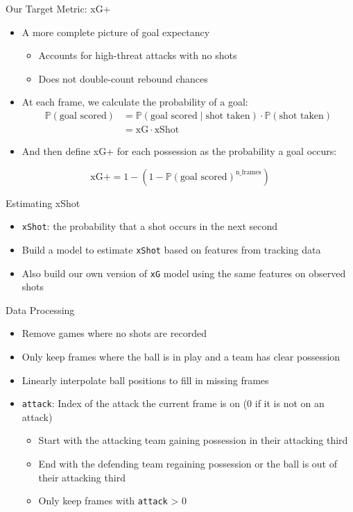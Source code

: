 \documentclass{beamer}
\begin{document}
\begin{frame}{Our Target Metric: xG+}
\begin{itemize}
\item A more complete picture of goal expectancy
  \begin{itemize}
  \item Accounts for high-threat attacks with no shots
  \item Does not double-count rebound chances
  \end{itemize}
\item At each frame, we calculate the probability of a goal:
\begin{align*}
\mathbb{P}(\text{goal scored}) &= \mathbb{P}(\text{goal scored} \mid \text{shot taken})\cdot\mathbb{P}(\text{shot taken}) \\
  &= \text{xG}\cdot\text{xShot}
\end{align*}
\item And then define xG+ for each possession as the probability a goal occurs:
\end{itemize}
$$\text{xG+} = 1 - (1 - \mathbb{P}(\text{goal scored})^{\text{n\_frames}})$$
\end{frame}

\begin{frame}{Estimating xShot}
\begin{itemize}
\item \texttt{xShot}: the probability that a shot occurs in the next second
\item Build a model to estimate \texttt{xShot} based on features from tracking data
\item Also build our own version of \texttt{xG} model using the same features on observed shots
\end{itemize}
\end{frame}

\begin{frame}{Data Processing}
\begin{itemize}
\item Remove games where no shots are recorded
\item Only keep frames where the ball is in play and a team has clear possession
\item Linearly interpolate ball positions to fill in missing frames
\item \texttt{attack}: Index of the attack the current frame is on (0 if it is not on an attack)
  \begin{itemize}
  \item Start with the attacking team gaining possession in their attacking third
  \item End with the defending team regaining possession or the ball is out of their attacking third
  \item Only keep frames with \texttt{attack} > 0
  \end{itemize}
\end{itemize}
\end{frame}
\end{document}
